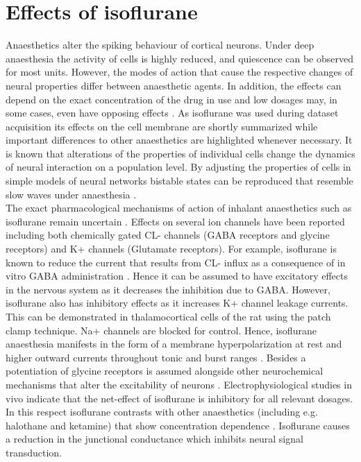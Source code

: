 \section{Effects of isoflurane}
\label{effects_of_anaesthesia}
Anaesthetics alter the spiking behaviour of cortical neurons. Under deep anaesthesia the activity of cells is highly reduced, and quiescence can be observed for most units. However, the modes of action that cause the respective changes of neural properties differ between anaesthetic agents. In addition, the effects can depend on the exact concentration of the drug in use and low dosages may, in some cases, even have opposing effects \parencite{moghadam2019comparative}. As isoflurane was used during dataset acquisition its effects on the cell membrane are shortly summarized while important differences to other anaesthetics are highlighted whenever necessary. It is known that alterations of the properties of individual cells change the dynamics of neural interaction on a population level. By adjusting the properties of cells in simple models of neural networks bistable states can be reproduced that resemble slow waves under anaesthesia \parencite{jercog2017up}.\\
The exact pharmacological mechanisms of action of inhalant anaesthetics such as isoflurane remain uncertain \parencite{miller2020inhalational}. Effects on several ion channels have been reported including both chemically gated CL- channels (GABA receptors and glycine receptors) and K+ channels (Glutamate receptors). For example, isoflurane is known to reduce the current that results from CL- influx as a consequence of in vitro GABA administration \parencite{jenkins1999effects}. Hence it can be assumed to have excitatory effects in the nervous system as it decreases the inhibition due to GABA. However, isoflurane also has inhibitory effects as it increases K+ channel leakage currents. This can be demonstrated in thalamocortical cells of the rat using the patch clamp technique. Na+ channels are blocked for control. Hence, isoflurane anaesthesia manifests in the form of a membrane hyperpolarization at rest and higher outward currents throughout tonic and burst ranges \parencite{ries1999ionic}. Besides a potentiation of glycine receptors is assumed alongside other neurochemical mechanisms that alter the excitability of neurons \parencite{pubchem2020iso}. Electrophysiological studies in vivo indicate that the net-effect of isoflurane is inhibitory for all relevant dosages. In this respect isoflurane contrasts with other anaesthetics (including e.g. halothane and ketamine) that show concentration dependence \parencite{moghadam2019comparative}. Isoflurane causes a reduction in the junctional conductance which inhibits neural signal transduction.\\
